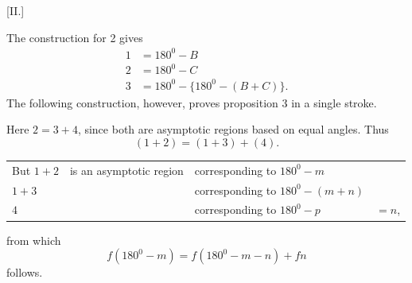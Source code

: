 %
\begin{center}[II.]\end{center}
The construction for 2 gives
\[
\begin{aligned}
1&=180^{0}-B\\
2&=180^{0}-C\\
3&=180^{0}-\{180^{0}-(B+C)\}.
\end{aligned}
\]
The following construction, however, proves proposition 3 in a single stroke.
\begin{center}\hspace{.5em}\end{center}
Here $2=3+4$, since both are asymptotic regions based on equal angles. Thus
\[
(1+2)=(1+3)+(4).
\]
\begin{center}
\setlength{\tabcolsep}{4.5pt}
\begin{tabular}{@{}llll@{}}
But $1+2$&is an asymptotic region&corresponding to $180^{0}-m$&\\
\hspace{2em}$1+3$&&corresponding to $180^{0}-(m+n)$&\\
\hspace{2em}$4$&&corresponding to $180^{0}-p$&$=n$,
\end{tabular}
\end{center}
\noindent from which
\[
f(180^{0}-m)=f(180^{0}-m-n)+fn
\]
follows.

